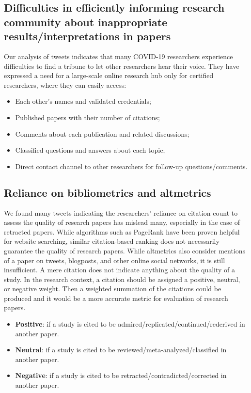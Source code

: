 \documentclass[acmsmall,authordraft]{acmart}
\begin{document}
\subsection{Difficulties in efficiently informing research community about inappropriate results/interpretations in papers}
\label{Discussion_Difficulties_in_efficiently_informing_research_community}
Our analysis of tweets indicates that many COVID-19 researchers experience difficulties to find a tribune to let other researchers hear their voice. They have expressed a need for a large-scale online research hub only for certified researchers, where they can easily access:
\begin{itemize}
   \item Each other’s names and validated credentials;
   \item Published papers with their number of citations;
   \item Comments about each publication and related discussions;
   \item Classified questions and answers about each topic;
   \item Direct contact channel to other researchers for follow-up questions/comments.
\end{itemize}

\subsection{Reliance on bibliometrics and altmetrics}
We found many tweets indicating the researchers’ reliance on citation count to assess the quality of research papers has mislead many, especially in the case of retracted papers. While algorithms such as PageRank \citep{page1999pagerank} have been proven helpful for website searching, similar citation-based ranking does not necessarily guarantee the quality of research papers. While altmetrics also consider mentions of a paper on tweets, blogposts, and other online social networks, it is still insufficient. A mere citation does not indicate anything about the quality of a study. In the research context, a citation should be assigned a positive, neutral, or negative weight. Then a weighted summation of the citations could be produced and it would be a more accurate metric for evaluation of research papers.
\begin{itemize}
   \item \textbf{Positive}: if a study is cited to be admired/replicated/continued/rederived in another paper.
   \item \textbf{Neutral}: if a study is cited to be reviewed/meta-analyzed/classified in another paper.
   \item \textbf{Negative}: if a study is cited to be retracted/contradicted/corrected in another paper.
\end{itemize}
\end{document}
